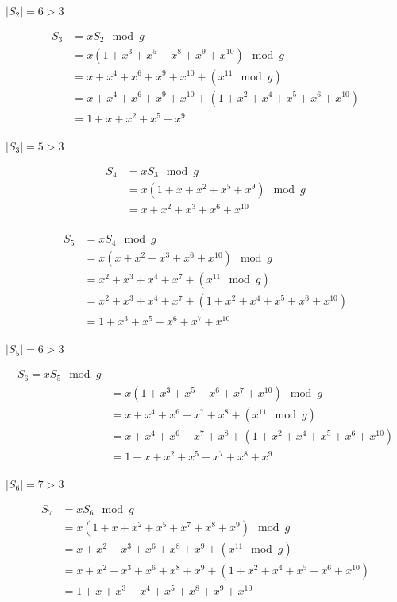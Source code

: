 \documentclass[12pt,a4paper]{article}
\begin{document}
$|S_{2}| = 6 > 3$

\begin{align*}
    S_{3} &= x S_{2} \mod g\\
    &= x (1 + x^{3} + x^{5} + x^{8} + x^{9} + x^{10}) \mod g\\
    &= x + x^{4} + x^{6} + x^{9} + x^{10} + (x^{11} \mod g)\\
    &= x + x^{4} + x^{6} + x^{9} + x^{10} + (1 + x^{2} + x^{4} + x^{5} + x^{6} + x^{10})\\
    &= 1 + x + x^{2} + x^{5} + x^{9}\\  
\end{align*}

$|S_{3}| = 5 > 3$

\begin{align*}
    S_{4} &= x S_{3} \mod g\\
    &= x (1 + x + x^{2} + x^{5} + x^{9}) \mod g\\
    &= x + x^{2} + x^{3} + x^{6} + x^{10}\\
\end{align*}

\begin{align*}
    S_{5} &= x S_{4} \mod g\\
    &= x (x + x^{2} + x^{3} + x^{6} + x^{10}) \mod g\\
    &= x^{2} + x^{3} + x^{4} + x^{7} + (x^{11} \mod g)\\
    &= x^{2} + x^{3} + x^{4} + x^{7} + (1 + x^{2} + x^{4} + x^{5} + x^{6} + x^{10})\\
    &= 1 + x^{3} + x^{5} + x^{6} + x^{7} + x^{10}\\
\end{align*}

$|S_{5}| = 6 > 3$

\begin{align*}
    S_{6} = x S_{5} \mod g\\
    &= x (1 + x^{3} + x^{5} + x^{6} + x^{7} + x^{10}) \mod g\\
    &= x + x^{4} + x^{6} + x^{7} + x^{8} + (x^{11} \mod g)\\
    &= x + x^{4} + x^{6} + x^{7} + x^{8} + (1 + x^{2} + x^{4} + x^{5} + x^{6} + x^{10})\\
    &= 1 + x + x^{2} + x^{5} + x^{7} + x^{8} + x^{9}\\
\end{align*}

$|S_{6}| = 7 > 3$

\begin{align*}
    S_{7} &= x S_{6} \mod g\\
    &= x (1 + x + x^{2} + x^{5} + x^{7} + x^{8} + x^{9}) \mod g\\
    &= x + x^{2} + x^{3} + x^{6} + x^{8} + x^{9} + (x^{11} \mod g)\\
    &= x + x^{2} + x^{3} + x^{6} + x^{8} + x^{9} + (1 + x^{2} + x^{4} + x^{5} + x^{6} + x^{10})\\
    &= 1 + x + x^{3} + x^{4} + x^{5} + x^{8} + x^{9} + x^{10}\\
\end{align*}
\end{document}
